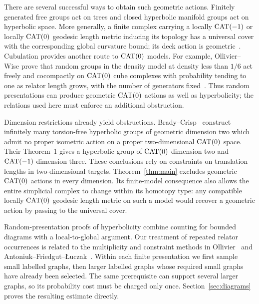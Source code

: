 There are several successful ways to obtain such geometric actions.
Finitely generated free groups act on trees and closed hyperbolic manifold groups act on
hyperbolic space. More generally, a finite complex carrying a locally
$\operatorname{CAT}(-1)$ or locally $\operatorname{CAT}(0)$ geodesic length metric inducing its topology has a universal cover
with the corresponding global curvature bound; its deck action is
geometric~\cite[Theorem~II.4.1]{BH1999}.
Cubulation provides another route to $\operatorname{CAT}(0)$ models.
For example, Ollivier--Wise prove that random groups in the density
model at density less than $1/6$ act freely and cocompactly on
$\operatorname{CAT}(0)$ cube complexes with probability tending to one as relator
length grows, with the number of generators fixed~\cite[Theorem~10.4]{OllivierWise2011}.
Thus random presentations can produce geometric $\operatorname{CAT}(0)$ actions as
well as hyperbolicity; the relations used here must enforce an
additional obstruction.

Dimension restrictions already yield obstructions.
Brady--Crisp~\cite[Theorem~2]{BradyCrisp2007} construct infinitely many
torsion-free hyperbolic groups of geometric dimension two which admit
no proper isometric action on a proper two-dimensional $\operatorname{CAT}(0)$
space. Their Theorem~1 gives a hyperbolic group of $\operatorname{CAT}(0)$ dimension
two and $\operatorname{CAT}(-1)$ dimension three. These conclusions rely on
constraints on translation lengths in two-dimensional targets.
Theorem~\ref{thm:main} excludes geometric $\operatorname{CAT}(0)$ actions in every
dimension. Its finite-model consequence also allows the entire
simplicial complex to change within its homotopy type: any compatible
locally $\operatorname{CAT}(0)$ geodesic length metric on such a model would recover a geometric
action by passing to the universal cover.

Random-presentation proofs of hyperbolicity combine counting for
bounded diagrams with a local-to-global argument.
Our treatment of repeated relator occurrences is related to the
multiplicity and constraint methods in
Ollivier~\cite[Section~2.2]{Ollivier2004} and
Antoniuk--Friedgut--\L uczak~\cite[Section~3]{AntoniukFriedgutLuczak2017}.
Within each finite presentation we first sample small labelled graphs,
then larger labelled graphs whose required small graphs have already
been selected. The same prerequisite can support several larger
graphs, so its probability cost must be charged only once.
Section~\ref{sec:diagrams} proves the resulting estimate directly.

